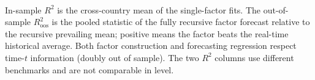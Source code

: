 \\[0.8ex]
{\scriptsize\begin{minipage}{0.92\linewidth}
In-sample $R^{2}$ is the cross-country mean of the single-factor fits. The out-of-sample $R^{2}_{\mathrm{oos}}$ is the pooled \citet{campbellthompson2008} statistic of the fully recursive factor forecast relative to the recursive prevailing mean; positive means the factor beats the real-time historical average. Both factor construction and forecasting regression respect time-$t$ information (doubly out of sample). The two $R^{2}$ columns use different benchmarks and are not comparable in level.
\end{minipage}}
